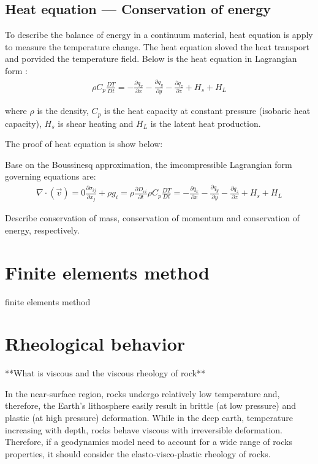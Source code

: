 \subsection{Heat equation --- Conservation of energy}

To describe the balance of energy in a continuum material, heat equation is apply to measure the temperature change. The heat equation sloved the heat transport and porvided the temperature field. Below is the heat equation in Lagrangian form :
\begin{align}
\rho C_p \frac{DT}{Dt} = -\frac{\partial q_x}{\partial x}-\frac{\partial q_y}{\partial y}-\frac{\partial q_z}{\partial z}+H_s+H_L
\end{align}

where $\rho$ is the density, $C_p$ is the heat capacity at constant pressure (isobaric heat capacity), $H_s$ is shear heating and $H_L$ is the latent heat production.

The proof of heat equation is show below:

Base on the Boussinesq approximation, the imcompressible Lagrangian form governing equations are:
\begin{align}
\nabla \cdot (\vec v) = 0 
\frac{\partial \sigma_{ij}}{\partial x_j}+\rho g_i = \rho \frac{\partial D_{vi}}{\partial t}
\rho C_p \frac{DT}{Dt} = -\frac{\partial q_x}{\partial x}-\frac{\partial q_y}{\partial y}-\frac{\partial q_z}{\partial z}+H_s+H_L
\end{align}

Describe conservation of mass, conservation of momentum and conservation of energy, respectively.


\section{Finite elements method}

finite elements method

\section{Rheological behavior}

**What is viscous and the viscous rheology of rock**

In the near-surface region, rocks undergo relatively low temperature and, therefore, the Earth's lithosphere easily result in brittle (at low pressure) and plastic (at high pressure) deformation. 
While in the deep earth, temperature increasing with depth, rocks behave viscous with irreversible deformation. 
Therefore, if a geodynamics model need to account for a wide range of rocks properties, it should consider the elasto-visco-plastic rheology of rocks.

